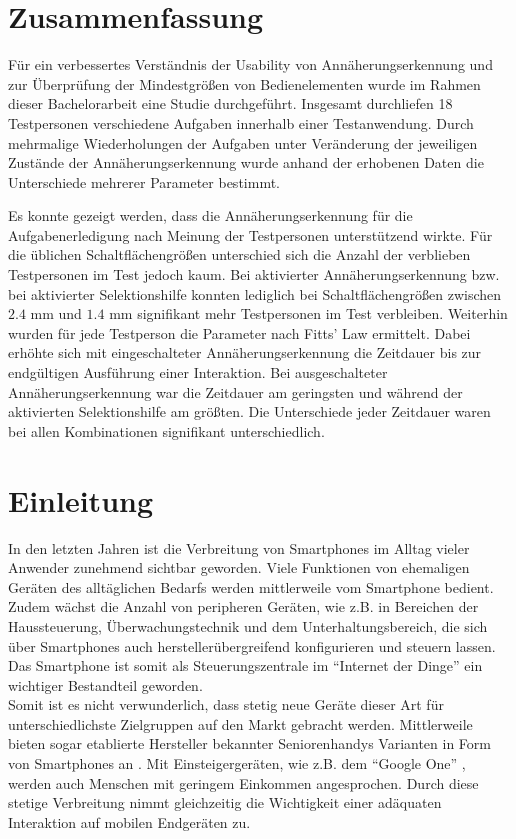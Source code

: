\documentclass[12pt,numbers=noenddot,parskip,bibliography=totocnumbered,listof=totocnumbered]{scrreprt}
\begin{document}
\tableofcontents
\thispagestyle{nochapternumber}

\chapter*{Zusammenfassung}
Für ein verbessertes Verständnis der Usability von Annäherungserkennung und zur Überprüfung der Mindestgrößen von Bedienelementen wurde im Rahmen dieser Bachelorarbeit eine Studie durchgeführt. Insgesamt durchliefen 18 Testpersonen verschiedene Aufgaben innerhalb einer Testanwendung. Durch mehrmalige Wiederholungen der Aufgaben unter Veränderung der jeweiligen Zustände der Annäherungserkennung wurde anhand der erhobenen Daten die Unterschiede mehrerer Parameter bestimmt.

Es konnte gezeigt werden, dass die Annäherungserkennung für die Aufgabenerledigung nach Meinung der Testpersonen unterstützend wirkte. Für die üblichen Schaltflächengrößen unterschied sich die Anzahl der verblieben Testpersonen im Test jedoch kaum. Bei aktivierter Annäherungserkennung bzw. bei aktivierter Selektionshilfe konnten lediglich bei Schaltflächengrößen zwischen $2.4$ mm  und $1.4$ mm signifikant mehr Testpersonen im Test verbleiben. Weiterhin wurden für jede Testperson die Parameter nach Fitts' Law ermittelt. Dabei erhöhte sich mit eingeschalteter Annäherungserkennung die Zeitdauer bis zur endgültigen Ausführung einer Interaktion. Bei ausgeschalteter Annäherungserkennung war die Zeitdauer am geringsten und während der aktivierten Selektionshilfe am größten. Die Unterschiede jeder Zeitdauer waren bei allen Kombinationen signifikant unterschiedlich.

\chapter{Einleitung}
In den letzten Jahren ist die Verbreitung von Smartphones im Alltag vieler Anwender zunehmend sichtbar geworden. Viele Funktionen von ehemaligen Geräten des alltäglichen Bedarfs werden mittlerweile vom Smartphone bedient. Zudem wächst die Anzahl von peripheren Geräten, wie z.B. in Bereichen der Haussteuerung, Überwachungstechnik und dem Unterhaltungsbereich, die sich über Smartphones auch herstellerübergreifend konfigurieren und steuern lassen. Das Smartphone ist somit als Steuerungszentrale im "`Internet der Dinge"' ein wichtiger Bestandteil geworden.\\
Somit ist es nicht verwunderlich, dass stetig neue Geräte dieser Art für unterschiedlichste Zielgruppen auf den Markt gebracht werden. Mittlerweile bieten sogar etablierte Hersteller bekannter Seniorenhandys Varianten in Form von Smartphones an \citep{dorol}. Mit Einsteigergeräten, wie z.B. dem "`Google One"' \citep{gOne}, werden auch Menschen mit geringem Einkommen angesprochen. Durch diese stetige Verbreitung nimmt gleichzeitig die Wichtigkeit einer adäquaten Interaktion auf mobilen Endgeräten zu.
\end{document}
